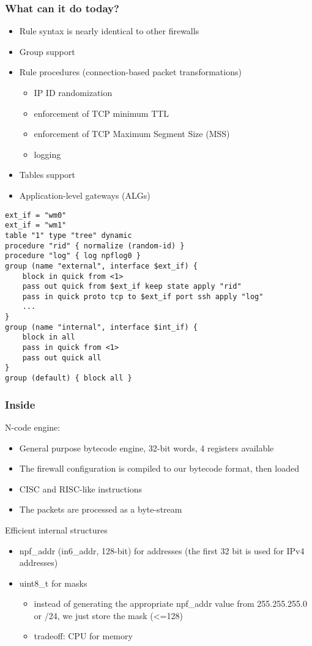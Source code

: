 \documentclass[magyar]{beamer}
\begin{document}
\begin{frame}
\frametitle{What can it do today?}
\begin{itemize}
	\item Rule syntax is nearly identical to other firewalls
	\item Group support
	\item Rule procedures (connection-based packet transformations)
	\begin{itemize}
		\item IP ID randomization
		\item enforcement of TCP minimum TTL
		\item enforcement of TCP Maximum Segment Size (MSS)
		\item logging
	\end{itemize}
	\item Tables support
	\item Application-level gateways (ALGs)
\end{itemize}
\end{frame}

\begin{frame}[fragile,basicstyle=\ttfamily]
\begin{verbatim}
ext_if = "wm0"
ext_if = "wm1"
table "1" type "tree" dynamic
procedure "rid" { normalize (random-id) }
procedure "log" { log npflog0 }
group (name "external", interface $ext_if) {
    block in quick from <1>
    pass out quick from $ext_if keep state apply "rid"
    pass in quick proto tcp to $ext_if port ssh apply "log"
    ...
}
group (name "internal", interface $int_if) {
    block in all
    pass in quick from <1>
    pass out quick all
}
group (default) { block all }
\end{verbatim}
\end{frame}

\begin{frame}
\frametitle{Inside}
N-code engine:
\begin{itemize}
	\item General purpose bytecode engine, 32-bit words, 4 registers available
	\item The firewall configuration is compiled to our bytecode format, then loaded
	\item CISC and RISC-like instructions
	\item The packets are processed as a byte-stream
\end{itemize}
Efficient internal structures
\begin{itemize}
	\item npf\_addr (in6\_addr, 128-bit) for addresses (the first 32 bit is used for IPv4 addresses)
	\item uint8\_t for masks
	\begin{itemize}
		\item instead of generating the appropriate npf\_addr value from  255.255.255.0 or /24, we just store
the mask (<=128)
		\item tradeoff: CPU for memory
	\end{itemize}
\end{itemize}
\end{frame}
\end{document}
